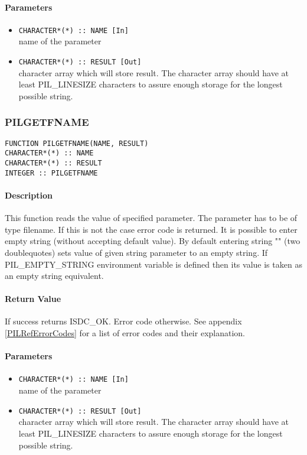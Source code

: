 \paragraph{Parameters}
\begin{itemize}
\item
{\tt CHARACTER*(*) :: NAME [In] } \\
name of the parameter 
\item
{\tt CHARACTER*(*) :: RESULT [Out] } \\
character array which will store result. The character array should have at
least PIL\_LINESIZE characters to assure enough storage for the longest possible string. 
\end{itemize}



\subsubsection{PILGETFNAME}

\begin{verbatim}
FUNCTION PILGETFNAME(NAME, RESULT) 
CHARACTER*(*) :: NAME 
CHARACTER*(*) :: RESULT 
INTEGER :: PILGETFNAME
\end{verbatim}

\paragraph{Description\\}
This function reads the value of specified parameter. The parameter has to
be of type filename. If this is not the case error code is returned. 
It is possible to enter empty string (without accepting default value).
By default entering string "" (two doublequotes) sets value of given string
parameter to an empty string. If PIL\_EMPTY\_STRING environment variable
is defined then its value is taken as an empty string equivalent.

\paragraph{Return Value\\}
If success returns ISDC\_OK. Error code otherwise. See appendix \ref{PILRefErrorCodes}
for a list of error codes and their explanation.

\paragraph{Parameters}
\begin{itemize}
\item
{\tt CHARACTER*(*) :: NAME [In] } \\
name of the parameter 
\item
{\tt CHARACTER*(*) :: RESULT [Out] } \\
character array which will store result. The character array should have at
least PIL\_LINESIZE characters to assure enough storage for the longest possible string. 
\end{itemize}

